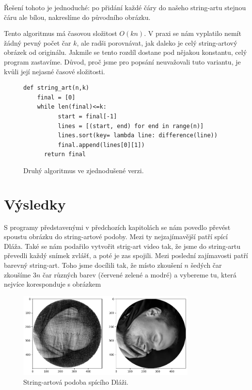 \documentclass{article}
\begin{document}
Řešení tohoto je jednoduché: po přidání každé čáry do našeho string-artu stejnou
čáru ale bílou, nakreslíme do původního obrázku.

Tento algoritmus má časovou složitost $O(kn)$. V praxi se nám vyplatilo nemít
žádný pevný počet čar $k$, ale radši porovnávat, jak daleko je celý string-artový obrázek od
originálu. Jakmile se tento rozdíl dostane pod nějakou konstantu, celý
program zastavíme. Důvod, proč jsme pro popsání neuvažovali tuto variantu, je kvůli její
nejasné časové složitosti. 


\begin{figure}
 \label{fig:second}
\begin{mdframed}[style=MyFrame]
\begin{lstlisting}[style=metoo]
def string_art(n,k)
    final = [0]
    while len(final)<=k:
	      start = final[-1]
	      lines = [(start, end) for end in range(n)]
	      lines.sort(key= lambda line: difference(line))
	      final.append(lines[0][1])
	  return final
 \end{lstlisting}
\end{mdframed}

 \caption{Druhý algoritmus ve zjednodušené verzi.}
\end{figure}




\section{Výsledky}
\label{sec:vysledky}
S programy představenými v předchozích kapitolách se nám povedlo převést spoustu
obrázku do string-artové podoby. Mezi ty nejzajímavější patří spící Dláža. Také
se nám podařilo vytvořit strig-art video tak, že jsme do
string-artu převedli každý snímek zvlášť, a poté je zas spojili. Mezi poslední
zajímavosti patří barevný string-art. Toho jsme docílili tak, že místo zkoušení $n$ šedých čar zkoušíme $3n$ čar různých barev (červené zelené a modré) a vybereme tu, která nejvíce koresponduje s obrázkem

\begin{figure}[!ht]
	\centering
	\includegraphics[width=0.8\textwidth]{dlazka.png}
	\caption{String-artová podoba spícího Dláži.}
	\label{fig:dlazka}
\end{figure}
\end{document}
